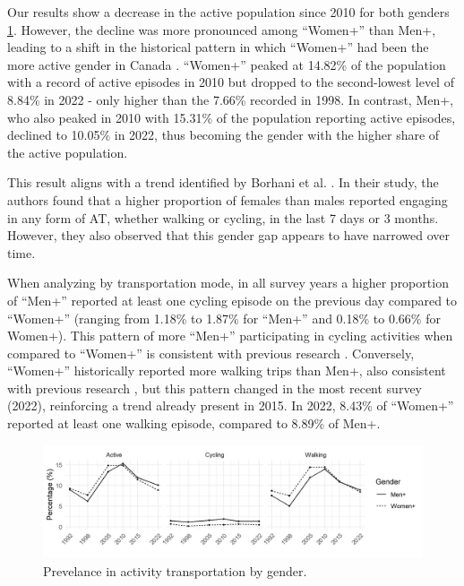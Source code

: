 \documentclass[preprint, 3p,
authoryear]{elsarticle} %
\begin{document}
Our results show a decrease in the active population since 2010 for both
genders \ref{fig:gender-perc-figure}. However, the decline was more
pronounced among ``Women+'' than Men+, leading to a shift in the
historical pattern in which ``Women+'' had been the more active gender
in Canada \citep{bryan2009, borhani2024}. ``Women+'' peaked at 14.82\%
of the population with a record of active episodes in 2010 but dropped
to the second-lowest level of 8.84\% in 2022 - only higher than the
7.66\% recorded in 1998. In contrast, Men+, who also peaked in 2010 with
15.31\% of the population reporting active episodes, declined to 10.05\%
in 2022, thus becoming the gender with the higher share of the active
population.

This result aligns with a trend identified by Borhani et al.
\citeyearpar{borhani2024}. In their study, the authors found that a
higher proportion of females than males reported engaging in any form of
AT, whether walking or cycling, in the last 7 days or 3 months. However,
they also observed that this gender gap appears to have narrowed over
time.

When analyzing by transportation mode, in all survey years a higher
proportion of ``Men+'' reported at least one cycling episode on the
previous day compared to ``Women+'' (ranging from 1.18\% to 1.87\% for
``Men+'' and 0.18\% to 0.66\% for Women+). This pattern of more ``Men+''
participating in cycling activities when compared to ``Women+'' is
consistent with previous research
\citep{heesch2012, bryan2009, borhani2024}. Conversely, ``Women+''
historically reported more walking trips than Men+, also consistent with
previous research \citep{goel2023, pollard2017, bryan2009, borhani2024},
but this pattern changed in the most recent survey (2022), reinforcing a
trend already present in 2015. In 2022, 8.43\% of ``Women+'' reported at
least one walking episode, compared to 8.89\% of Men+.

\begin{figure}
\includegraphics[width=1\linewidth]{figures/active_pop_gender_graph} \caption{Prevelance in activity transportation by gender.}\label{fig:gender-perc-figure}
\end{figure}
\end{document}

